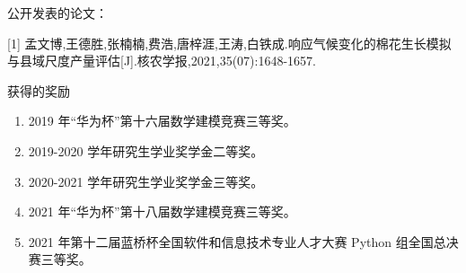 \documentclass[a4paper,oneside,zihao=-4,AutoFakeBold,fontset=windows]{ctexbook}
\begin{document}
\begin{spacing}{}
  公开发表的论文：

  [1] 孟文博,王德胜,张楠楠,费浩,唐梓涯,王涛,白铁成.响应气候变化的棉花生长模拟与县域尺度产量评估[J].核农学报,2021,35(07):1648-1657.

  获得的奖励
  \begin{enumerate}
    \item 2019 年“华为杯”第十六届数学建模竞赛三等奖。
    \item 2019{-}2020 学年研究生学业奖学金二等奖。
    \item 2020{-}2021 学年研究生学业奖学金三等奖。
    \item 2021 年“华为杯”第十八届数学建模竞赛三等奖。
    \item 2021 年第十二届蓝桥杯全国软件和信息技术专业人才大赛 Python 组全国总决赛三等奖。
  \end{enumerate}
\end{spacing}

\end{document}
